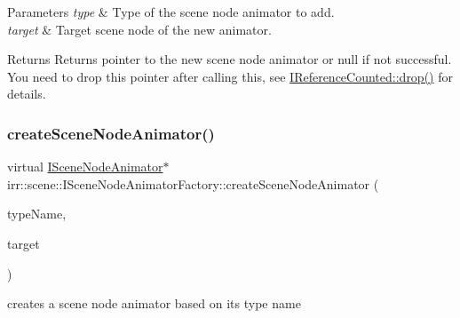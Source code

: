 \begin{DoxyParams}{Parameters}
{\em type} & Type of the scene node animator to add. \\
\hline
{\em target} & Target scene node of the new animator. \\
\hline
\end{DoxyParams}
\begin{DoxyReturn}{Returns}
Returns pointer to the new scene node animator or null if not successful. You need to drop this pointer after calling this, see \hyperlink{classirr_1_1IReferenceCounted_a03856a09355b89d178090c4a5f738543}{I\+Reference\+Counted\+::drop()} for details. 
\end{DoxyReturn}
\mbox{\label{classirr_1_1scene_1_1ISceneNodeAnimatorFactory_a093f1fb03d8e1c73ff60c8612b0ba778}} 
\subsubsection{\texorpdfstring{create\+Scene\+Node\+Animator()}{createSceneNodeAnimator()}\hspace{0.1cm}{\footnotesize\ttfamily [3/4]}}
{\footnotesize\ttfamily virtual \hyperlink{classirr_1_1scene_1_1ISceneNodeAnimator}{I\+Scene\+Node\+Animator}$\ast$ irr\+::scene\+::\+I\+Scene\+Node\+Animator\+Factory\+::create\+Scene\+Node\+Animator (\begin{DoxyParamCaption}\item[{const \hyperlink{namespaceirr_a9395eaea339bcb546b319e9c96bf7410}{c8} $\ast$}]{type\+Name,  }\item[{\hyperlink{classirr_1_1scene_1_1ISceneNode}{I\+Scene\+Node} $\ast$}]{target }\end{DoxyParamCaption})\hspace{0.3cm}{\ttfamily [pure virtual]}}



creates a scene node animator based on its type name 


